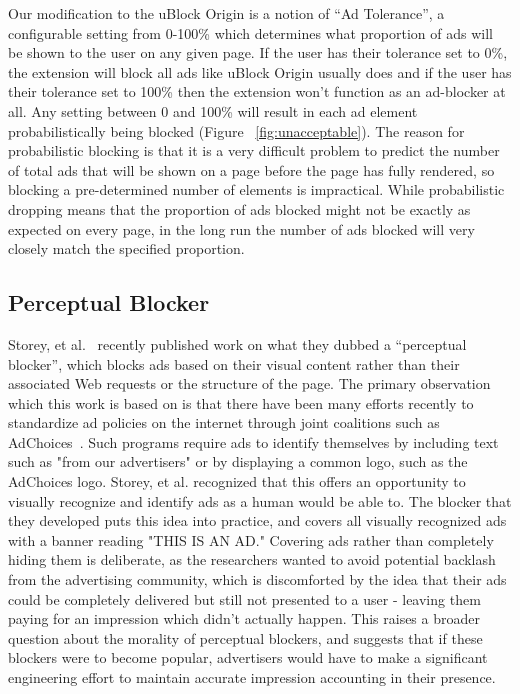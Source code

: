 Our modification to the uBlock Origin is a notion of ``Ad Tolerance'', a configurable setting from 0-100\% which determines what proportion of ads will be shown to the user on any given page.
If the user has their tolerance set to 0\%, the extension will block all ads like uBlock Origin usually does and if the user has their tolerance set to 100\% then the extension won't function as an ad-blocker at all.
Any setting between 0 and 100\% will result in each ad element probabilistically being blocked (Figure ~\ref{fig:unacceptable}).
The reason for probabilistic blocking is that it is a very difficult problem to predict the number of total ads that will be shown on a page before the page has fully rendered, so blocking a pre-determined number of elements is impractical.
While probabilistic dropping means that the proportion of ads blocked might not be exactly as expected on every page, in the long run the number of ads blocked will very closely match the specified proportion.

\subsection{Perceptual Blocker}
Storey, et al.~\cite{storey2016future} recently published work on what they dubbed a ``perceptual blocker'', which blocks ads based on their visual content rather than their associated Web requests or the structure of the page.
The primary observation which this work is based on is that there have been many efforts recently to standardize ad policies on the internet through joint coalitions such as AdChoices~\cite{adchoices}.
Such programs require ads to identify themselves by including text such as "from our advertisers" or by displaying a common logo, such as the AdChoices logo.
Storey, et al. recognized that this offers an opportunity to visually recognize and identify ads as a human would be able to.
The blocker that they developed puts this idea into practice, and covers all visually recognized ads with a banner reading "THIS IS AN AD."
Covering ads rather than completely hiding them is deliberate, as the researchers wanted to avoid potential backlash from the advertising community, which is discomforted by the idea that their ads could be completely delivered but still not presented to a user - leaving them paying for an impression which didn't actually happen.
This raises a broader question about the morality of perceptual blockers, and suggests that if these blockers were to become popular, advertisers would have to make a significant engineering effort to maintain accurate impression accounting in their presence.

